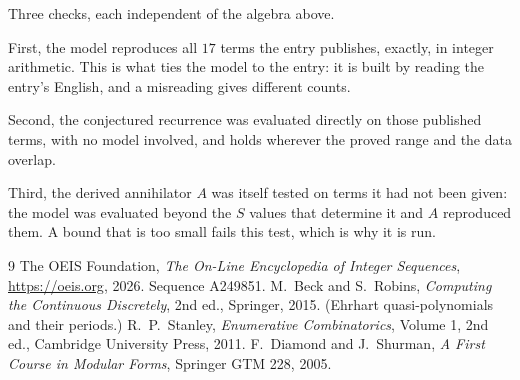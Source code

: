 \documentclass[11pt,a4paper]{article}
\theoremstyle{plain}
\theoremstyle{definition}
\begin{document}
Three checks, each independent of the algebra above.

First, the model reproduces all $17$ terms the entry publishes, exactly, in integer
arithmetic. This is what ties the model to the entry: it is built by reading the entry's
English, and a misreading gives different counts.

Second, the conjectured recurrence was evaluated directly on those published terms, with no
model involved, and holds wherever the proved range and the data overlap.

Third, the derived annihilator $A$ was itself tested on terms it had not been given: the model
was evaluated beyond the $S$ values that determine it and $A$ reproduced them. A bound that is
too small fails this test, which is why it is run.

\begin{thebibliography}{9}
 The OEIS Foundation, \emph{The On-Line Encyclopedia of Integer
Sequences}, \url{https://oeis.org}, 2026. Sequence A249851.
 M.~Beck and S.~Robins, \emph{Computing the Continuous Discretely},
2nd ed., Springer, 2015. (Ehrhart quasi-polynomials and their periods.)
 R.~P.~Stanley, \emph{Enumerative Combinatorics}, Volume 1, 2nd ed.,
Cambridge University Press, 2011.
 F.~Diamond and J.~Shurman, \emph{A First Course in Modular Forms},
Springer GTM 228, 2005.
\end{thebibliography}
\end{document}

